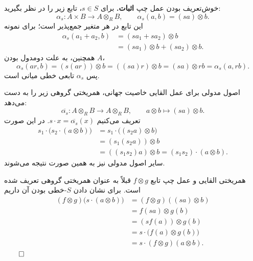 \begin{frame}[t]{خوش‌تعریف بودن عمل چپ}
\label{lec20:alpha-balanced}
\textbf{اثبات.} برای \(s\in S\)، تابع زیر را در نظر بگیرید:
\[
    \alpha_s:A\times B\longrightarrow A\otimes_R B,
    \qquad \alpha_s(a,b)=(sa)\otimes b.
\]
این تابع در هر متغیر جمع‌پذیر است؛ برای نمونه
\[
\begin{aligned}
\alpha_s(a_1+a_2,b)
  &=(sa_1+sa_2)\otimes b\\
  &=(sa_1)\otimes b+(sa_2)\otimes b.
\end{aligned}
\]
همچنین، به علت دومدول بودن \(A\)،
\[
    \alpha_s(ar,b)=(s(ar))\otimes b
    =((sa)r)\otimes b=(sa)\otimes rb=\alpha_s(a,rb).
\]
پس \(\alpha_s\) تابعی خطی میانی است.
\end{frame}

\begin{frame}[t]{اصول مدولی برای عمل القایی}
\label{lec20:left-module-axioms}
خاصیت جهانی، همریختی گروهی زیر را به دست می‌دهد:
\[
    \overline{\alpha_s}:A\otimes_R B\longrightarrow A\otimes_R B,
    \qquad a\otimes b\longmapsto (sa)\otimes b.
\]
تعریف می‌کنیم \(s\cdot x=\overline{\alpha_s}(x)\). در این صورت
\[
\begin{aligned}
s_1\cdot\bigl(s_2\cdot(a\otimes b)\bigr)
  &=s_1\cdot\bigl((s_2a)\otimes b\bigr)\\
  &=(s_1(s_2a))\otimes b\\
  &=((s_1s_2)a)\otimes b=(s_1s_2)\cdot(a\otimes b).
\end{aligned}
\]
سایر اصول مدولی نیز به همین صورت نتیجه می‌شوند.
\end{frame}

\begin{frame}[t]{همریختی القایی و عمل چپ}
\label{lec20:left-tensor-morphism}
تابع \(f\otimes g\) قبلاً به عنوان همریختی گروهی تعریف شده است. برای نشان دادن \(S\)-خطی بودن آن داریم
\[
\begin{aligned}
(f\otimes g)\bigl(s\cdot(a\otimes b)\bigr)
  &=(f\otimes g)((sa)\otimes b)\\
  &=f(sa)\otimes g(b)\\
  &=(sf(a))\otimes g(b)\\
  &=s\cdot\bigl(f(a)\otimes g(b)\bigr)\\
  &=s\cdot(f\otimes g)(a\otimes b).
\end{aligned}
\]
\hfill\(\qed\)
\end{frame}

